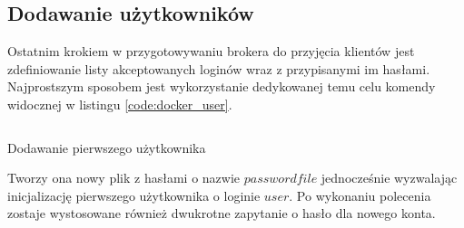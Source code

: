         \subsection{Dodawanie użytkowników}
            Ostatnim krokiem w przygotowywaniu brokera do przyjęcia klientów jest zdefiniowanie listy akceptowanych loginów wraz z przypisanymi im hasłami. Najprostszym sposobem jest wykorzystanie dedykowanej temu celu komendy widocznej w listingu \ref{code:docker_user}.
            
            \begin{kod}
                \inputminted[firstline=14]{sh}{mqtt/listings/docker.sh}
                \caption{Dodawanie pierwszego użytkownika}
                \label{code:docker_user}
                \vspace{2em}
            \end{kod}
            
            Tworzy ona nowy plik z hasłami o nazwie $passwordfile$ jednocześnie wyzwalając inicjalizację pierwszego użytkownika o loginie $user$. Po wykonaniu polecenia zostaje wystosowane również dwukrotne zapytanie o hasło dla nowego konta.